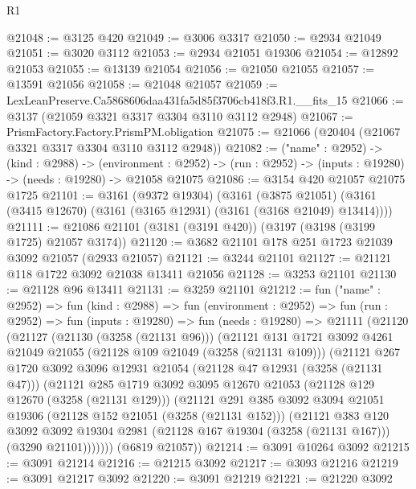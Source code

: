 \begin{lexlean}{R1}
\begin{coremodule}
@21048 := @3125 @420
@21049 := @3006 @3317
@21050 := @2934 @21049
@21051 := @3020 @3112
@21053 := @2934 @21051 @19306
@21054 := @12892 @21053
@21055 := @13139 @21054
@21056 := @21050 @21055
@21057 := @13591 @21056
@21058 := @21048 @21057
@21059 := LexLeanPreserve.Ca5868606daa431fa5d85f3706cb418f3.R1.__fits_15
@21066 := @3137 (@21059 @3321 @3317 @3304 @3110 @3112 @2948)
@21067 := PrismFactory.Factory.PrismPM.obligation
@21075 := @21066 (@20404 (@21067 @3321 @3317 @3304 @3110 @3112 @2948))
@21082 := ("name" : @2952) ->
  (kind : @2988) ->
  (environment : @2952) -> (run : @2952) -> (inputs : @19280) -> (needs : @19280) -> @21058 @21075
@21086 := @3154 @420 @21057 @21075 @1725
@21101 := @3161
    (@9372 @19304)
    (@3161
      (@3875 @21051)
      (@3161 (@3415 @12670) (@3161 (@3165 @12931) (@3161 (@3168 @21049) @13414))))
@21111 := @21086 @21101 (@3181 (@3191 @420)) (@3197 (@3198 (@3199 @1725) @21057 @3174))
@21120 := @3682 @21101 @178 @251 @1723 @21039 @3092 @21057 (@2933 @21057)
@21121 := @3244 @21101
@21127 := @21121 @118 @1722 @3092 @21038 @13411 @21056
@21128 := @3253 @21101
@21130 := @21128 @96 @13411
@21131 := @3259 @21101
@21212 := fun ("name" : @2952) =>
  fun (kind : @2988) =>
  fun (environment : @2952) =>
  fun (run : @2952) =>
  fun (inputs : @19280) =>
  fun (needs : @19280) =>
  @21111
    (@21120
      (@21127
        (@21130 (@3258 (@21131 @96)))
        (@21121
          @131
          @1721
          @3092
          @4261
          @21049
          @21055
          (@21128 @109 @21049 (@3258 (@21131 @109)))
          (@21121
            @267
            @1720
            @3092
            @3096
            @12931
            @21054
            (@21128 @47 @12931 (@3258 (@21131 @47)))
            (@21121
              @285
              @1719
              @3092
              @3095
              @12670
              @21053
              (@21128 @129 @12670 (@3258 (@21131 @129)))
              (@21121
                @291
                @385
                @3092
                @3094
                @21051
                @19306
                (@21128 @152 @21051 (@3258 (@21131 @152)))
                (@21121
                  @383
                  @120
                  @3092
                  @3092
                  @19304
                  @2981
                  (@21128 @167 @19304 (@3258 (@21131 @167)))
                  (@3290 @21101)))))))
      (@6819 @21057))
@21214 := @3091 @10264 @3092
@21215 := @3091 @21214
@21216 := @21215 @3092
@21217 := @3093 @21216
@21219 := @3091 @21217 @3092
@21220 := @3091 @21219
@21221 := @21220 @3092

\end{coremodule}
\end{lexlean}

